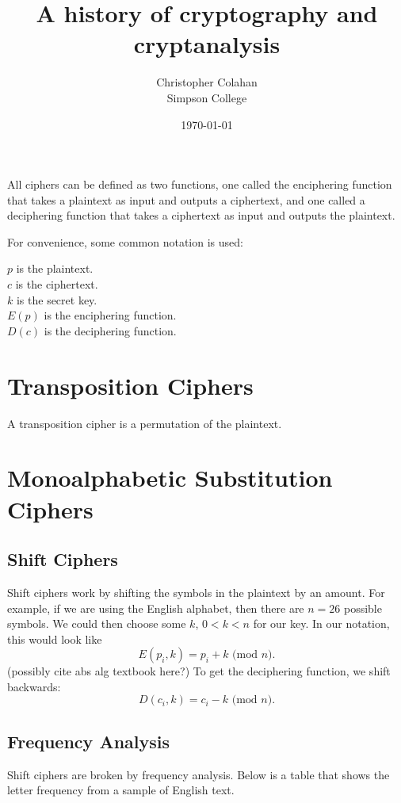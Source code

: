 \documentclass[12pt]{article}
\title{A history of cryptography and cryptanalysis}
\date{\today}
\author{Christopher Colahan\\ Simpson College}
\begin{document}
\maketitle
\newpage

\tableofcontents
\newpage

All ciphers can be defined as two functions, one called the enciphering function that takes a plaintext as input and outputs a ciphertext, and one called a deciphering function that takes a ciphertext as input and outputs the plaintext.

For convenience, some common notation is used:

{\centering
	$p$ is the plaintext.\\
	$c$ is the ciphertext.\\
	$k$ is the secret key.\\
	$E(p)$ is the enciphering function.\\
	$D(c)$ is the deciphering function.\\
}


\section{Transposition Ciphers}
A transposition cipher is a permutation of the plaintext.

\section{Monoalphabetic Substitution Ciphers}

\subsection{Shift Ciphers}
Shift ciphers work by shifting the symbols in the plaintext by an amount. For example, if we are using the English alphabet, then there are $n=26$ possible symbols. We could then choose some $k$, $0<k<n$ for our key. In our notation, this would look like
$$E(p_i,k)=p_i+k\text{ (mod $n$)}.$$ (possibly cite abs alg textbook here?)
To get the deciphering function, we shift backwards:
$$D(c_i,k)=c_i-k\text{ (mod $n$)}.$$

\subsection{Frequency Analysis}
Shift ciphers are broken by frequency analysis. Below is a table that shows the letter frequency from a sample of English text.
\end{document}

